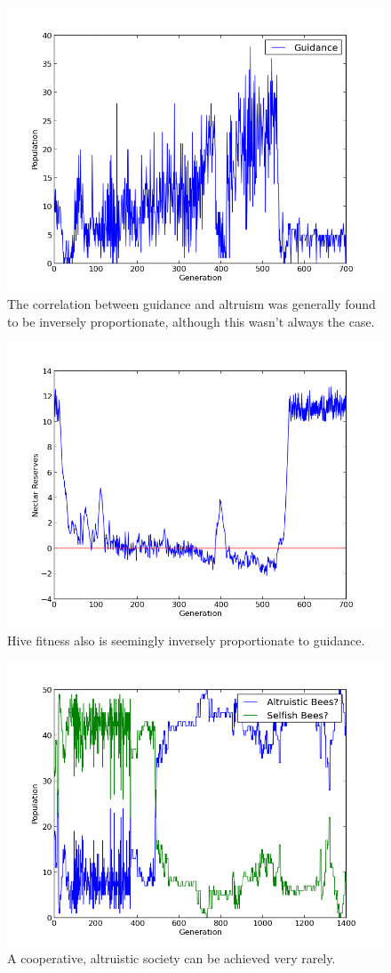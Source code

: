 \documentclass[twoside]{article}
\begin{document}
\begin{multicols}{2}
			\begin{figure}[H]
				\begin{center}
					\includegraphics[width=.5\textwidth]{results/gossip_plot_twist_tell.png}
				\end{center}
                \caption{The correlation between guidance and altruism was generally found to be inversely proportionate, although this wasn't always the case.}
				\label{fig:gossip_guidance}
			\end{figure}

                        \begin{figure}[H]
				\begin{center}
					\includegraphics[width=.5\textwidth]{results/gossip_plot_twist_res.png}
				\end{center}
				\caption{Hive fitness also is seemingly inversely proportionate to guidance.}
				\label{fig:gossip_reserves}
			\end{figure}

			\begin{figure}[H]
				\begin{center}
					\includegraphics[width=.5\textwidth]{results/gossip_alt_comp.png}
				\end{center}
				\caption{A cooperative, altruistic society can be achieved very rarely.}
				\label{fig:altruistic_composition}
			\end{figure}


\end{multicols}
\end{document}
